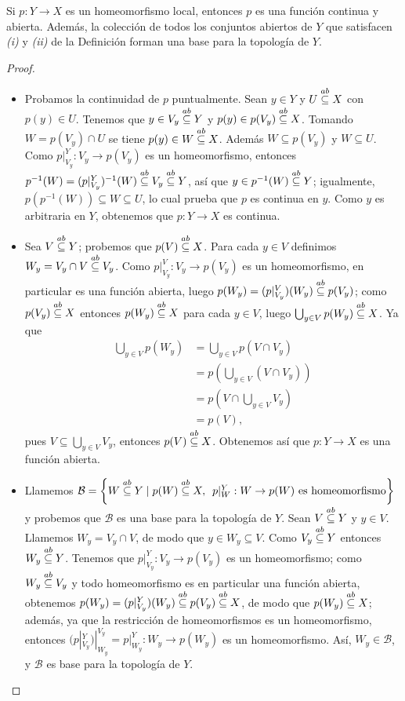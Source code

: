 \begin{Prop}
   Si $p:Y\to X$ es un homeomorfismo local, entonces $p$ es una función continua y abierta. Además, la colección de todos los conjuntos abiertos de $Y$ que satisfacen \textit{(i)} y \textit{(ii)} de la Definición  forman una base para la topología de $Y$.
\end{Prop}
\begin{proof}
   \begin{itemize}
      \item Probamos la continuidad de $p$ puntualmente. Sean $y\in Y$ y $U\stackrel{ab}{\subseteq} X$ con $p(y)\in U$. Tenemos que $y\in V_y\stackrel{ab}{\subseteq} Y$ y $p(y)\in p(V_y)\stackrel{ab}{\subseteq} X$. Tomando $W=p(V_y)\cap U$ se tiene $p(y)\in W\stackrel{ab}{\subseteq} X$. Además $W\subseteq p(V_y)$ y $W\subseteq U$. Como $p|^{Y}_{V_y}:V_y\to p(V_y)$ es un homeomorfismo, entonces $p^{-1}(W)=(p|^{Y}_{V_y})^{-1}(W)\stackrel{ab}{\subseteq} V_y \stackrel{ab}{\subseteq} Y$, así que $y\in p^{-1}(W)\stackrel{ab}{\subseteq} Y$; igualmente, $p(p^{-1}(W))\subseteq W \subseteq U$, lo cual prueba que $p$ es continua en $y$. Como $y$ es arbitraria en $Y$, obtenemos que $p:Y\to X$ es continua.
      \item Sea $V\stackrel{ab}{\subseteq} Y$; probemos que $p(V)\stackrel{ab}{\subseteq} X$. Para cada $y\in V$ definimos $W_y=V_y\cap V\stackrel{ab}{\subseteq} V_y$. Como $p|^{V}_{V_y}:V_y\to p(V_y)$ es un homeomorfismo, en particular es una función abierta, luego $p(W_y)=(p|^{V}_{V_y})(W_y)\stackrel{ab}{\subseteq} p(V_y)$; como $p(V_y)\stackrel{ab}{\subseteq} X$ entonces $p(W_y)\stackrel{ab}{\subseteq} X$ para cada $y\in V$, luego $\bigcup_{y\in V} p(W_y)\stackrel{ab}{\subseteq} X$. Ya que
         $$
         \begin{aligned}
            \bigcup_{y\in V}p(W_y)&=\bigcup_{y\in V}p(V\cap V_y)\\
                                  &=p\left( \bigcup_{y\in V}(V\cap V_y)\right)\\
                                  &=p\left( V\cap\bigcup_{y\in V}V_y\right)\\
                                  &=p(V),
         \end{aligned}
         $$
         pues $V\subseteq \bigcup_{y\in V}V_y$, entonces $p(V)\stackrel{ab}{\subseteq} X$. Obtenemos así que $p:Y\to X$ es una función abierta.
      \item Llamemos $\mathcal{B}=\left\lbrace W\stackrel{ab}{\subseteq} Y\mid p(W)\stackrel{ab}{\subseteq} X,\phantom{o} p|^{Y}_{W}:W\to p(W)\text{ es homeomorfismo}\right\rbrace$ y probemos que $\mathcal{B}$ es una base para la topología de $Y$. Sean $V\stackrel{ab}{\subseteq} Y$ y $y\in V$. Llamemos $W_y=V_y\cap V$, de modo que $y\in W_y\subseteq V$. Como $V_y\stackrel{ab}{\subseteq} Y$ entonces $W_y\stackrel{ab}{\subseteq} Y$. Tenemos que $p|^{Y}_{V_y}:V_y\to p(V_y)$ es un homeomorfismo; como $W_y\stackrel{ab}{\subseteq} V_y$ y todo homeomorfismo es en particular una función abierta, obtenemos $p(W_y)=(p|^{Y}_{V_y})(W_y)\stackrel{ab}{\subseteq} p(V_y) \stackrel{ab}{\subseteq} X$, de modo que $p(W_y)\stackrel{ab}{\subseteq} X$; además, ya que la restricción de homeomorfismos es un homeomorfismo, entonces $(p|^{Y}_{V_y})|^{V_y}_{W_y}=p|^{Y}_{W_y}:W_y\to p(W_y)$ es un homeomorfismo. Así, $W_y\in \mathcal{B}$, y $\mathcal{B}$ es base para la topología de $Y$.
   \end{itemize}
\end{proof}
